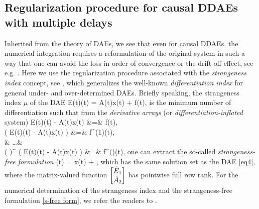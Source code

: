 \documentclass[final,reqno]{siamltex}
\begin{document}
\subsection{Regularization procedure for causal DDAEs with multiple delays}\label{Sec2.1}
Inherited from the theory of DAEs, we see that even for causal DDAEs, the numerical integration requires a reformulation of the original system in such a way that one can 
avoid the loss in order of convergence or the drift-off effect, see e.g. \cite{BreCP96,KunM06}. Here we use the regularization procedure 
associated with the \emph{strangeness index} concept, see \cite{KunM06}, which generalizes the well-known \emph{differentiation index} \cite{BreCP96} for general 
under- and over-determined DAEs. Briefly speaking, the strangeness index $\mu$ of the DAE 
%
\be\label{eq4}
 E(t)(t) = A(t)x(t) + f(t), 
\ee
%
is the minimum number of differentiation such that from the \emph{derivative arrays} (or \emph{differentiation-inflated} system)
%
\bens
 E(t)(t) - A(t)x(t)  &=& f(t), \\
 \ddt \left( E(t)(t) - A(t)x(t) \right) &=& f^{(1)}(t), \\
 & \dots & \\
 \left( \ddt \right)^{\mu} \left( E(t)(t) - A(t)x(t) \right) &=& f^{(\mu)}(t),
\eens
%
one can extract the so-called \emph{strangeness-free formulation}
%
\be\label{s-free form}
  (t) =  x(t) + ,
\ee
%
which has the same solution set as the DAE \eqref{eq4}, where the matrix-valued function $\begin{bmatrix} \hat{E}_1 \\ \hat{A}_2 \end{bmatrix}$ has pointwise full row rank.
For the numerical determination of the strangeness index and the strangeness-free formulation \eqref{s-free form}, we refer the readers to 
\cite{KunMRW97,KunMS05}.
\end{document}
